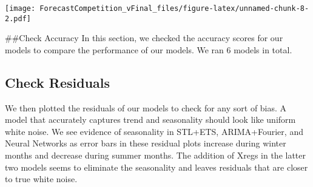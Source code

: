 \documentclass[
]{article}
\newenvironment{Shaded}{\begin{snugshade}}{\end{snugshade}}
\newcommand{\AttributeTok}[1]{\textcolor[rgb]{0.77,0.63,0.00}{#1}}
\newcommand{\CommentTok}[1]{\textcolor[rgb]{0.56,0.35,0.01}{\textit{#1}}}
\newcommand{\FunctionTok}[1]{\textcolor[rgb]{0.00,0.00,0.00}{#1}}
\newcommand{\NormalTok}[1]{#1}
\newcommand{\OtherTok}[1]{\textcolor[rgb]{0.56,0.35,0.01}{#1}}
\newcommand{\SpecialCharTok}[1]{\textcolor[rgb]{0.00,0.00,0.00}{#1}}
\newcommand{\StringTok}[1]{\textcolor[rgb]{0.31,0.60,0.02}{#1}}
\begin{document}
\texttt{[image: ForecastCompetition\_vFinal\_files/figure-latex/unnamed-chunk-8-2.pdf]}

\#\#Check Accuracy In this section, we checked the accuracy scores for
our models to compare the performance of our models. We ran 6 models in
total.

\begin{Shaded}
\end{Shaded}

\hypertarget{check-residuals}{%
\subsection{Check Residuals}\label{check-residuals}}

We then plotted the residuals of our models to check for any sort of
bias. A model that accurately captures trend and seasonality should look
like uniform white noise. We see evidence of seasonality in STL+ETS,
ARIMA+Fourier, and Neural Networks as error bars in these residual plots
increase during winter months and decrease during summer months. The
addition of Xregs in the latter two models seems to eliminate the
seasonality and leaves residuals that are closer to true white noise.

\begin{Shaded}
\end{Shaded}
\end{document}
